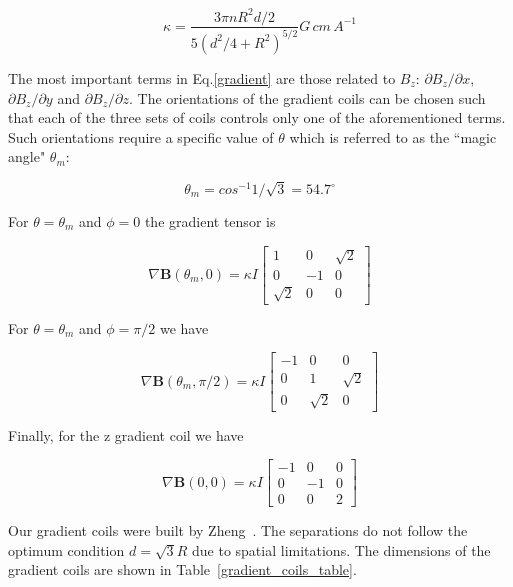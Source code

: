 \begin{equation}
\kappa = \frac{3\pi n R^2 d/2}{5(d^2/4+R^2)^{5/2}}G\,cm\,A^{-1}
\end{equation}

The most important terms in Eq.\ref{gradient} are those related to $B_z$: $\partial B_z/\partial x$, $\partial B_z/\partial y$ and $\partial B_z/\partial z$. The orientations of the gradient coils can be chosen such that each of the three sets of coils controls only one of the aforementioned terms. Such orientations require a specific value of $\theta$ which is referred to as the ``magic angle" $\theta_m$:

\begin{equation}
\theta_m = cos^{-1}1/\sqrt{3}=54.7^{\circ}
\end{equation}

For $\theta=\theta_m$ and $\phi=0$ the gradient tensor is

\begin{equation}
\nabla\boldsymbol{B}(\theta_m, 0)=\kappa I
\begin{bmatrix}
1 & 0 & \sqrt{2}\\
0 & -1 & 0 \\
\sqrt{2} & 0 & 0
\end{bmatrix}
\end{equation}

For $\theta=\theta_m$ and $\phi=\pi/2$ we have

\begin{equation}
\nabla\boldsymbol{B}(\theta_m, \pi/2)=\kappa I
\begin{bmatrix}
-1 & 0 & 0\\
0 & 1 & \sqrt{2}\\
0 & \sqrt{2} & 0
\end{bmatrix}
\end{equation}

Finally, for the z gradient coil we have

\begin{equation}
\nabla\boldsymbol{B}(0, 0)=\kappa I
\begin{bmatrix}
-1 & 0 & 0\\
0 & -1 & 0\\
0 & 0 & 2
\end{bmatrix}
\end{equation}

Our gradient coils were built by Zheng~\cite{YuanThesis}. The separations do not follow the optimum condition $d=\sqrt{3}R$ due to spatial limitations. The dimensions of the gradient coils are shown in Table~\ref{gradient_coils_table}.

